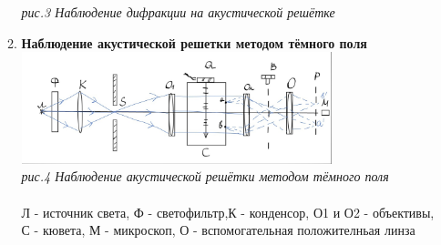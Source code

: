 \documentclass[a4paper]{article}
\begin{document}
\begin{multicols}{2}
\begin{enumerate}
\begin{enumerate}
\textit{рис.3 Наблюдение дифракции на акустической решётке}\\
\item \textbf{Наблюдение акустической решетки методом тёмного поля}\\
\includegraphics[width=9cm]{exp2}\\
\textit{рис.4 Наблюдение акустической решётки методом тёмного поля}\\
\\
Л - источник света, Ф - светофильтр,К - конденсор, О1 и О2 - объективы, С - кювета, М - микроскоп, О - вспомогательная положителньая линза\\
\end{enumerate}	


\end{enumerate}
\end{multicols}
\end{document}
